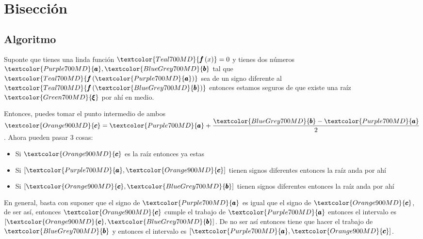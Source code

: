 \documentclass[12pt, fleqn]{report}                             %
\theoremstyle{break}                                            %
\newcommand{\Wrap}[1]           {\left( #1 \right)}             %
\newcommand{\Color}[2]{\textcolor{#1}{#2}}                      %
\newcommand \ColorFun          {Teal700MD}                      %
\newcommand \ColorRoot         {Green700MD}                     %
\newcommand \ColorVarA         {Purple700MD}                    %
\newcommand \ColorVarB         {BlueGrey700MD}                  %
\newcommand \ColorVarC         {Orange900MD}                    %
\newcommand \Fun[1]      {\Color{\ColorFun}{\pmb{f}\Wrap{#1}}}          %
\newcommand \Root        {\Color{\ColorRoot}{\pmb{\xi} }}               %
\newcommand \VarA        {\Color{\ColorVarA}{\pmb{a} }}                 %
\newcommand \VarB        {\Color{\ColorVarB}{\pmb{b} }}                 %
\newcommand \VarC        {\Color{\ColorVarC}{\pmb{c} }}                 %
\begin{document}
    \chapter{Bisección}

        \section{Algoritmo}

            Suponte que tienes una linda función $\Fun{x} = 0$
            y tienes dos números $\VarA, \VarB$ tal que $\Fun{\VarA}$ sea de un signo diferente
            al $\Fun{\VarB}$ entonces estamos seguros de que existe una raíz $\Root$
            por ahí en medio.

            Entonces, puedes tomar el punto intermedio de ambos 
            $\VarC = \VarA + \dfrac{\VarB - \VarA}{2}$. Ahora pueden pasar 3 cosas:
            \begin{itemize}
                \item Si $\VarC$ es la raíz entonces ya estas
                \item Si $[\VarA, \VarC]$ tienen signos diferentes entonces la raíz anda por ahí
                \item Si $[\VarC, \VarB]$ tienen signos diferentes entonces la raíz anda por ahí
            \end{itemize}
            
            En general, basta con suponer que el signo de $\VarA$ es igual que el signo de $\VarC$,
            de ser así, entonces $\VarC$ cumple el trabajo de $\VarA$ entonces el intervalo es $[\VarC, \VarB]$.
            De no ser así entonces tiene que hacer el trabajo de $\VarB$ y entonces el intervalo es
            $[\VarA, \VarC]$.


\end{document}
